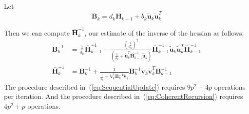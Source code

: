\documentclass[conference]{IEEEtran}
\newcommand{\oH}{\bm{\overline{H}}}
\begin{document}
Let
\begin{equation*}
\bm{B}_k=d_k\oH_{k-1}+b_k\bm{\tilde{u}}_k \bm{\tilde{u}}_k^{T}
\end{equation*}

Then we can compute $\oH_k^{-1}$, our estimate of the inverse of the hessian as follows:
\begin{align} \label{eq:SequentialUpdate}
\bm{B}_k^{-1}
&= \frac{1}{d_k}\oH_{k-1}^{-1} -
   \frac{(\frac{1}{d_k})^2}{(\frac{1}{b_k}+\bm{\tilde{u}}_k^{T}\oH_{k-1}^{-1}\bm{\tilde{u}}_k)}
   \oH_{k-1}^{-1}\bm{\tilde{u}}_k \bm{\tilde{u}}_k^{T}\oH_{k-1}^{-1}\\\nonumber
\oH_k^{-1}
&=\bm{B}_k^{-1} + \frac{1}{\frac{1}{b_k}+\bm{\tilde{v}}_k^{T}\bm{B}_k^{-1}\bm{\tilde{v}}_k} \bm{B}_k^{-1}\bm{\tilde{v}}_k \bm{\tilde{v}}_k^{T}\bm{B}_{k-1}^{-1}
\end{align}
The procedure described in~(\ref{eq:SequentialUpdate}) requires $9p^2 + 4p$ operations per iteration. And the procedure described in~(\ref{eq:CoherentRecursion}) requires $4p^2 + p$ operations.
%
%

\end{document}

